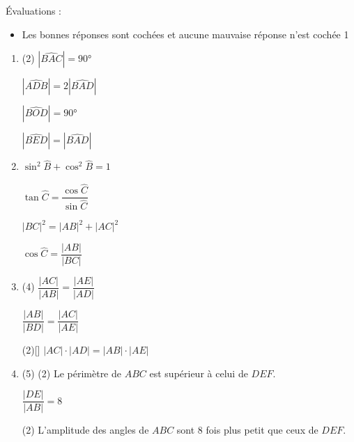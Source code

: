 %
%
    Évaluations :
    \begin{itemize}
        \item Les bonnes réponses sont cochées et aucune mauvaise réponse n'est cochée \hfill 1
    \end{itemize}
    \begin{enumerate}
        \item
              \begin{QCM}(2)
                  \choice[\faCheckSquare]
                  $|\widehat{BAC}|=\ang{90}$

                  \choice
                  $|\widehat{ADB}| = 2|\widehat{BAD}|$

                  \choice
                  $|\widehat{BOD}| = \ang{90}$

                  \choice[\faCheckSquare]
                  $|\widehat{BED}| = |\widehat{BAD}|$
              \end{QCM}
        \item
              \begin{QCM}
                  \choice
                  [\faCheckSquare] $\sin^2\widehat{B} + \cos^2\widehat{B}=1$

                  \choice
                  $\tan\widehat{C} = \dfrac{\cos\widehat{C}}{\sin\widehat{C}}$

                  \choice
                  [\faCheckSquare] $|BC|^2 = |AB|^2 + |AC|^2$

                  \choice
                  $\cos\widehat{C}=\dfrac{|AB|}{|BC|}$
              \end{QCM}
        \item
              \begin{QCM}(4)
                  \choice[\faCheckSquare]
                  $\dfrac{|AC|}{|AB|}=\dfrac{|AE|}{|AD|}$

                  \choice
                  $\dfrac{|AB|}{|BD|}=\dfrac{|AC|}{|AE|}$

                  \choice*(2)[\faCheckSquare]
                  $|AC|\cdot |AD| = |AB| \cdot |AE|$
              \end{QCM}
        \item
              \begin{QCM}(5)
                  \choice*(2)
                  Le périmètre de $ABC$ est supérieur à celui de $DEF$.

                  \choice[\faCheckSquare]
                  $\dfrac{|DE|}{|AB|}=8$

                  \choice*(2)
                  L'amplitude des angles de $ABC$ sont 8 fois plus petit que ceux de $DEF$.
              \end{QCM}
    \end{enumerate}
